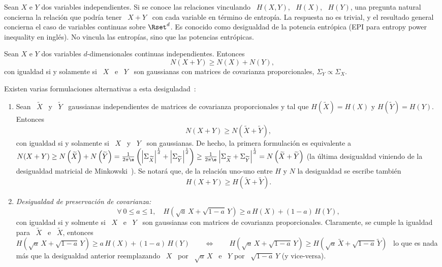 Sean  $X$ e  $Y$  dos variables  independientes.   Si se  conoce las  relaciones
vinculando \  $H(X,Y)$, \  $H(X)$, \ $H(Y)$,  una pregunta natural  concierna la
relaci\'on  que podr\'ia  tener \  $X+Y$  \ con  cada variable  en t\'ermino  de
entrop\'ia. La respuesta no es trivial, y el resultado general concierna el caso
de  variables continuas  sobre $\Rset^d$.   Es conocido  como desigualdad  de la
potencia entr\'opica (EPI para entropy power inequality en ingl\'es). No vincula
las entrop\'ias, sino que las potencias entr\'opicas.
%
\begin{teorema}
\label{Teo:SZ:EPI}
%
  Sean  $X$  e $Y$  dos  variables  $d$-dimensionales continuas  independientes.
  Entonces
  \[
  N(X + Y) \ge N(X) + N(Y),
  \]
%
  con igualdad si y  solamente si \ $X$ \ e \ $Y$  \ son gaussianas con matrices
  de covarianza proporcionales, $\Sigma_Y \propto \Sigma_X$.
\end{teorema}
%
\noindent     Existen    varias     formulaciones     alternativas    a     esta
desiguladad~\cite{Sha48, Lie78, CovTho06, DemCov91, Rio07}:
%
\begin{enumerate}
\item\label{EPI:SZ:EquivGauss} Sean  \ $\widetilde{X}$  \ y \  $\widetilde{Y}$ \
  gaussianas independientes  de matrices de covarianza proporcionales  y tal que
  $H(\widetilde{X}) = H(X)$ y $H(\widetilde{Y}) = H(Y)$.  Entonces
  \[
  N(X+Y) \ge N\left( \widetilde{X} + \widetilde{Y} \right),
  \]
  con igualdad si y solamente si \ $X$  \ y \ $Y$ \ son gaussianas. De hecho, la
  primera  formulaci\'on  es equivalente  a  $N(X+Y)  \ge N\left(  \widetilde{X}
  \right) +  N\left( \widetilde{Y}  \right) = \frac{1}{2  \pi \e}  \left( \left|
      \Sigma_{\widetilde{X}}  \right|^{\frac1d} +  \left| \Sigma_{\widetilde{Y}}
    \right|^{\frac1d}     \right)    \ge     \frac{1}{2    \pi     \e}    \left|
    \Sigma_{\widetilde{X}} +  \Sigma_{\widetilde{Y}} \right|^{\frac1d} = N\left(
    \widetilde{X} + \widetilde{Y} \right)$  (la \'ultima desigualdad viniendo de
  la  desigualdad matricial de  Minkowski~\cite{HarLit52, Min10}).   Se notar\'a
  que,  de la  relaci\'on uno-uno  entre  $H$ y  $N$ la  desigualdad se  escribe
  tambi\'en \[ H(X+Y) \ge H\left( \widetilde{X} + \widetilde{Y} \right).\]
%
\item\label{EPI:SZ:PresCov}    {\it    Desigualdad    de    preservaci\'on    de
    covarianza:}
  \[
  \forall  \:   0  \le  a  \le   1,  \quad  H\left(   \sqrt{a} \, X  +
    \sqrt{1-a} \, Y \right) \ge a \, H(X) + (1-a) \, H(Y),
  \]
  con igualdad si y solmente si \ $X$ \ e \ $Y$ \ son gaussianas con matrices de
  covarianza  proporcionales.    Claramente,  se  cumple  la   igualdad  para  \
  $\widetilde{X}$  \ e  \ $\widetilde{X}$,  entonces  $H\left( \sqrt{a}  \, X  +
    \sqrt{1-a} \, Y \right) \ge a \, H(X) + (1-a) \, H(Y) \qquad \Leftrightarrow
  \qquad H\left( \sqrt{a} \, X + \sqrt{1-a} \, Y \right) \ge H\left( \sqrt{a} \,
    \widetilde{X} + \sqrt{1-a} \, \widetilde{Y} \right) $ \ lo que es nada m\'as
  que la desigualdad anterior  reemplazando \ $X$ \ por \ $\sqrt{a}  \, X$ \ e \
  $Y$ por \ $\sqrt{1-a} \, Y$ (y vice-versa).
\end{enumerate}
%

